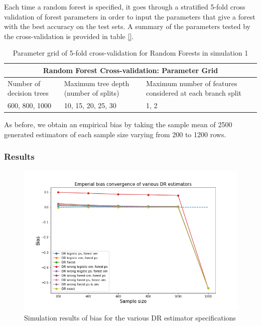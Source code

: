 \documentclass[12pt,twoside]{article}
\begin{document}
Each time a random forest is specified, it goes through a stratified 5-fold cross validation of forest parameters in order to input the parameters that give a forest with the best accuracy on the test sets. A summary of the parameters tested by the cross-validation is provided in table \ref{}.\\
\begin{table}[]
    \centering
\begin{tabular}{ |p{3cm}|p{3cm}|p{3cm}| }
 \hline
 \multicolumn{3}{|c|}{Random Forest Cross-validation: Parameter Grid} \\
 \hline
 Number of decision trees & Maximum tree depth (number of splits)  & Maximum    number of features considered at each branch split\\
 \hline
 600, 800, 1000& 10, 15, 20, 25, 30 & 1, 2 \\
 \hline 
\end{tabular}
\caption{Parameter grid of 5-fold cross-validation for Random Forests in simulation 1}
\end{table}

As before, we obtain an empirical bias by taking the sample mean of 2500 generated estimators of each sample size varying from 200 to 1200 rows. \\

\subsubsection*{Results}

\begin{figure}[h!]
    \centering
    \includegraphics[width = 0.9\columnwidth]{figures/biasRF.png}
    \caption{Simulation results of bias for the various DR estimator specifications}
    \label{figbiasRF}
\end{figure}
\end{document}

